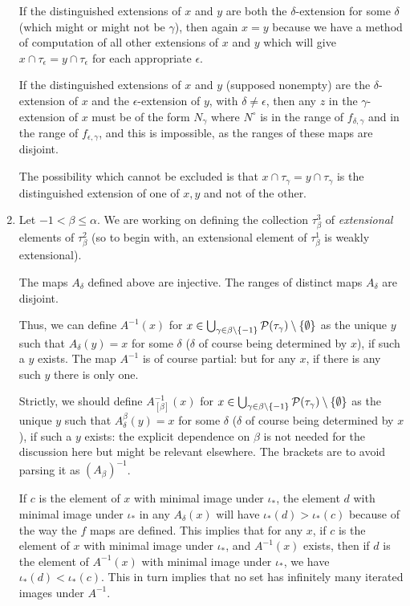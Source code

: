 \documentclass[12pt]{article}
\begin{document}
\begin{enumerate}
If the distinguished extensions of $x$ and $y$ are both the $\delta$-extension for some $\delta$ (which might or might not be $\gamma$), then again $x=y$ because we have a method of computation of all other extensions of $x$ and $y$ which will give $x \cap \tau_\epsilon = y \cap \tau_\epsilon$ for each appropriate $\epsilon$. 

If the distinguished extensions of $x$ and $y$ (supposed nonempty) are the $\delta$-extension of $x$ and the $\epsilon$-extension of $y$, with $\delta \neq \epsilon$, then any $z$ in the $\gamma$-extension of $x$ must be of the form $N_\gamma$ where $N^\circ$ is in the range of $f_{\delta,\gamma}$ and in the range of $f_{\epsilon,\gamma}$, and this is impossible, as the ranges of these maps are disjoint.

The possibility which cannot be excluded is that $x \cap \tau_\gamma = y \cap \tau_\gamma$ is the distinguished extension of one of $x,y$ and not of the other.

\item  Let $-1 < \beta \leq \alpha$.  We are working on defining the collection $\tau_\beta^3$ of {\em extensional\/} elements of $\tau^2_\beta$ (so to begin with,
an extensional element of $\tau^1_\beta$ is weakly extensional).

The maps $A_\delta$ defined above are injective.  The ranges of distinct maps $A_\delta$ are disjoint.  

Thus, we can define $A^{-1}(x)$ for $x \in \bigcup_{\gamma \in \beta\setminus \{-1\}} {\cal P} (\tau_\gamma) \setminus \{\emptyset\}$ as the unique $y$ such that $A_{\delta}(y)=x$ for some $\delta$ ($\delta$ of course being determined by $x$), if such a $y$ exists.  The map $A^{-1}$ is of course partial:  but for any $x$, if there is any such $y$ there is only one.

Strictly, we should define $A_{[\beta]}^{-1}(x)$ for $x \in \bigcup_{\gamma \in \beta\setminus \{-1\}} {\cal P} (\tau_\gamma) \setminus \{\emptyset\}$ as the unique $y$ such that $A^\beta_{\delta}(y)=x$ for some $\delta$ ($\delta$ of course being determined by $x$), if such a $y$ exists:  the explicit dependence on $\beta$ is not needed for the discussion here but might be relevant elsewhere.   The brackets are to avoid parsing it as $(A_\beta)^{-1}$.

If $c$ is the element of $x$ with minimal image under $\iota_*$, the element $d$ with minimal image under $\iota_*$ in any $A_\delta(x)$ will have $\iota_*(d) > \iota_*(c)$ because
of the way the $f$ maps are defined.  This implies that for any $x$, if $c$ is the element of $x$ with minimal image under $\iota_*$, and $A^{-1}(x)$ exists, then if
$d$ is the element of $A^{-1}(x)$ with minimal image under $\iota_*$, we have $\iota_*(d) < \iota_*(c)$.  This in turn implies that no set has infinitely many iterated images
under $A^{-1}$.


\end{enumerate}
\end{document}
